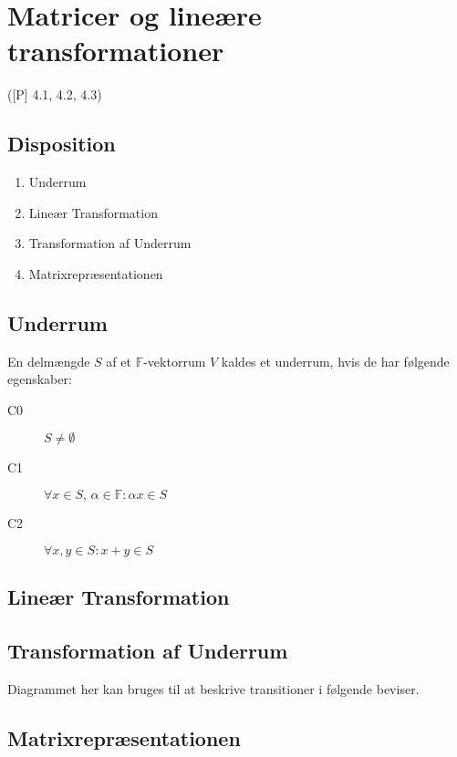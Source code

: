 \newpage
\chapter{Matricer og lineære transformationer}
([P] 4.1, 4.2, 4.3)

\section*{Disposition}
\begin{enumerate}
	\item Underrum
	\item Lineær Transformation
	\item Transformation af Underrum
	\item Matrixrepræsentationen
\end{enumerate}

\section{Underrum}
En delmængde $S$ af et $\mathbb{F}$-vektorrum $V$ kaldes et underrum, hvis de
har følgende egenskaber:
\begin{description}
	\item[C0] $S \not= \emptyset$
	\item[C1] $\forall x \in S, \, \alpha \in \mathbb{F} \colon \alpha x \in S$
	\item[C2] $\forall x,y \in S \colon x + y \in S$
\end{description}

\section{Lineær Transformation}


\section{Transformation af Underrum}


Diagrammet her kan bruges til at beskrive transitioner i følgende
beviser.
\begin{center}

\end{center}

\section{Matrixrepræsentationen}



